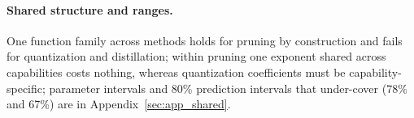 \paragraph{Shared structure and ranges.} One function family across
methods holds for pruning by construction and fails for quantization
and distillation; within pruning one exponent shared across
capabilities costs nothing, whereas quantization coefficients must be
capability-specific; parameter intervals and 80\% prediction
intervals that under-cover (78\% and 67\%) are in
Appendix~\ref{sec:app_shared}.

\FloatBarrier
